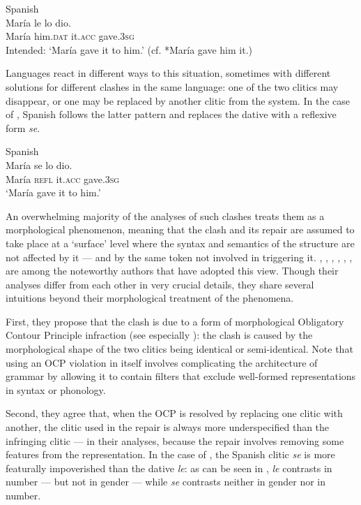 \documentclass[output=paper,modfonts,nonflat,newtxmath,colorlinks,citecolor=brown]{langsci/langscibook}
\begin{document}
\ea %
    \label{ex:cabre:1}
    Spanish\\
    \gll * María le lo dio.  \\
        { } {María} {him.\textsc{dat}}  it.\textsc{acc}  gave.\textsc{3sg}\\   
         \glt { } Intended: ‘María gave it to him.’ (cf. *{María} {gave} {him} {it}.)
    \z 

          
Languages react in different ways to this situation, sometimes with different solutions for different clashes in the same language: one of the two clitics may disappear, or one may be replaced by another clitic from the system. In the case of , Spanish follows the latter pattern and replaces the dative with a reflexive form \textit{se}.

\ea%
    \label{ex:cabre:2}
     Spanish \\
    \gll María  se  lo    dio.\\
        {María}  \textsc{refl}  it.\textsc{acc}  gave.3\textsc{sg}\\
    \glt ‘María gave it to him.’
    \z

  

 An overwhelming majority of the analyses of such clashes treats them as a morphological phenomenon, meaning that the clash and its repair are assumed to take place at a ‘surface’ level where the syntax and semantics of the structure are not affected by it — and by the same token not involved in triggering it. \citet{Perlmutter1971}, \citet{Bonet1991}, \citet{Bonet1993}, \citet{Bonet1995}, \citet{Grimshaw1997}, \citet{Pescarini2007}, \citet{Nevins2012} are among the noteworthy authors that have adopted this view. Though their analyses differ from each other in very crucial details, they share several intuitions beyond their morphological treatment of the phenomena. 

First, they propose that the clash is due to a form of morphological Obligatory Contour Principle infraction (see especially \citealt{Nevins2012}): the clash is caused by the morphological shape of the two clitics being identical or semi-identical. Note that using an OCP violation in itself involves complicating the architecture of grammar by allowing it to contain filters that exclude well-formed representations in syntax or phonology.

Second, they agree that, when the OCP is resolved by replacing one clitic with another, the clitic used in the repair is always more underspecified than the infringing clitic — in their analyses, because the repair involves removing some features from the representation. In the case of , the Spanish clitic \textit{se} is more featurally impoverished than the dative \textit{le}: as can be seen in , \textit{le} contrasts in number — but not in gender — while \textit{se} contrasts neither in gender nor in number.
\end{document}
